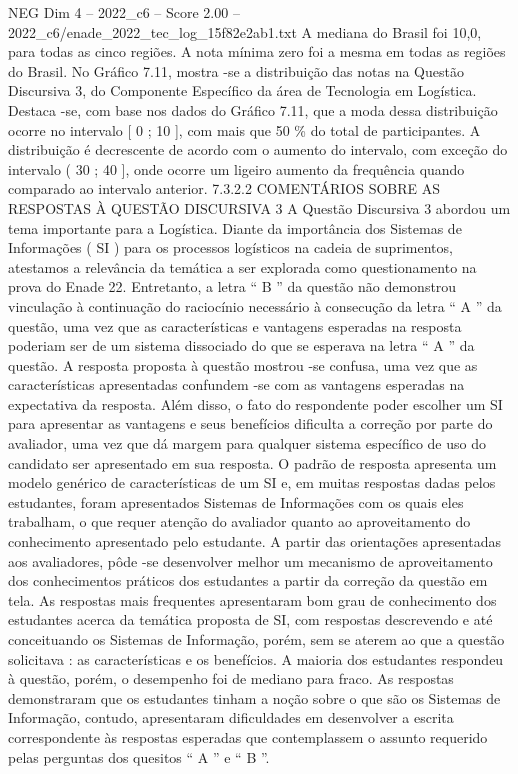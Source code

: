 \begin{textsample}{NEG Dim 4 – 2022\_c6 – Score 2.00 – 2022\_c6/enade\_2022\_tec\_log\_15f82e2ab1.txt}
A mediana do Brasil foi 10,0, para todas as cinco regiões.
A nota mínima zero foi a mesma em todas as regiões do Brasil.
No Gráfico 7.11, mostra -se a distribuição das notas na Questão Discursiva 3, do Componente Específico da área de Tecnologia em Logística.
Destaca -se, com base nos dados do Gráfico 7.11, que a moda dessa distribuição ocorre no intervalo [ 0 ; 10 ], com mais que 50 \% do total de participantes.
A distribuição é decrescente de acordo com o aumento do intervalo, com exceção do intervalo ( 30 ; 40 ], onde ocorre um ligeiro aumento da frequência quando comparado ao intervalo anterior. 7.3.2.2 COMENTÁRIOS SOBRE AS RESPOSTAS À QUESTÃO DISCURSIVA 3 A Questão Discursiva 3 abordou um tema importante para a Logística.
Diante da importância dos Sistemas de Informações ( SI ) para os processos logísticos na cadeia de suprimentos, atestamos a relevância da temática a ser explorada como questionamento na prova do Enade 22.
Entretanto, a letra “ B ” da questão não demonstrou vinculação à continuação do raciocínio necessário à consecução da letra “ A ” da questão, uma vez que as características e vantagens esperadas na resposta poderiam ser de um sistema dissociado do que se esperava na letra “ A ” da questão.
A resposta proposta à questão mostrou -se confusa, uma vez que as características apresentadas confundem -se com as vantagens esperadas na expectativa da resposta.
Além disso, o fato do respondente poder escolher um SI para apresentar as vantagens e seus benefícios dificulta a correção por parte do avaliador, uma vez que dá margem para qualquer sistema específico de uso do candidato ser apresentado em sua resposta.
O padrão de resposta apresenta um modelo genérico de características de um SI e, em muitas respostas dadas pelos estudantes, foram apresentados Sistemas de Informações com os quais eles trabalham, o que requer atenção do avaliador quanto ao aproveitamento do conhecimento apresentado pelo estudante.
A partir das orientações apresentadas aos avaliadores, pôde -se desenvolver melhor um mecanismo de aproveitamento dos conhecimentos práticos dos estudantes a partir da correção da questão em tela.
As respostas mais frequentes apresentaram bom grau de conhecimento dos estudantes acerca da temática proposta de SI, com respostas descrevendo e até conceituando os Sistemas de Informação, porém, sem se aterem ao que a questão solicitava : as características e os benefícios.
A maioria dos estudantes respondeu à questão, porém, o desempenho foi de mediano para fraco.
As respostas demonstraram que os estudantes tinham a noção sobre o que são os Sistemas de Informação, contudo, apresentaram dificuldades em desenvolver a escrita correspondente às respostas esperadas que contemplassem o assunto requerido pelas perguntas dos quesitos “ A ” e “ B ”.

\end{textsample}
